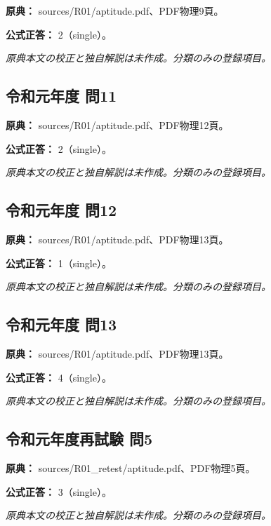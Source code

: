 \noindent\textbf{原典：} sources/R01/aptitude.pdf、PDF物理9頁。

\textbf{公式正答：} 2（single）。

\par\textit{原典本文の校正と独自解説は未作成。分類のみの登録項目。}

\subsection{令和元年度 問11}
\label{q:r01-reg-apt-11}

\noindent\textbf{原典：} sources/R01/aptitude.pdf、PDF物理12頁。

\textbf{公式正答：} 2（single）。

\par\textit{原典本文の校正と独自解説は未作成。分類のみの登録項目。}

\subsection{令和元年度 問12}
\label{q:r01-reg-apt-12}

\noindent\textbf{原典：} sources/R01/aptitude.pdf、PDF物理13頁。

\textbf{公式正答：} 1（single）。

\par\textit{原典本文の校正と独自解説は未作成。分類のみの登録項目。}

\subsection{令和元年度 問13}
\label{q:r01-reg-apt-13}

\noindent\textbf{原典：} sources/R01/aptitude.pdf、PDF物理13頁。

\textbf{公式正答：} 4（single）。

\par\textit{原典本文の校正と独自解説は未作成。分類のみの登録項目。}

\subsection{令和元年度再試験 問5}
\label{q:r01-ret-apt-05}

\noindent\textbf{原典：} sources/R01\_retest/aptitude.pdf、PDF物理5頁。

\textbf{公式正答：} 3（single）。

\par\textit{原典本文の校正と独自解説は未作成。分類のみの登録項目。}

